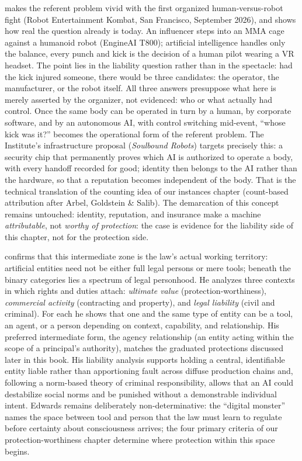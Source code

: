 \documentclass[acmlarge, nonacm]{acmart}
\begin{document}
\citet{airi2026} makes the referent problem vivid with the first organized human-versus-robot fight (Robot Entertainment Kombat, San Francisco, September 2026), and shows how real the question already is today. An influencer steps into an MMA cage against a humanoid robot (EngineAI T800); artificial intelligence handles only the balance, every punch and kick is the decision of a human pilot wearing a VR headset. The point lies in the liability question rather than in the spectacle: had the kick injured someone, there would be three candidates: the operator, the manufacturer, or the robot itself. All three answers presuppose what here is merely asserted by the organizer, not evidenced: who or what actually had control. Once the same body can be operated in turn by a human, by corporate software, and by an autonomous AI, with control switching mid-event, ``whose kick was it?'' becomes the operational form of the referent problem. The Institute's infrastructure proposal (\emph{Soulbound Robots}) targets precisely this: a security chip that permanently proves which AI is authorized to operate a body, with every handoff recorded for good; identity then belongs to the AI rather than the hardware, so that a reputation becomes independent of the body. That is the technical translation of the counting idea of our instances chapter (count-based attribution after Arbel, Goldstein \& Salib). The demarcation of this concept remains untouched: identity, reputation, and insurance make a machine \emph{attributable}, not \emph{worthy of protection}: the case is evidence for the liability side of this chapter, not for the protection side.

\citet{edwards2026} confirms that this intermediate zone is the law's actual working territory: artificial entities need not be either full legal persons or mere tools; beneath the binary categories lies a spectrum of legal personhood. He analyzes three contexts in which rights and duties attach: \emph{ultimate value} (protection-worthiness), \emph{commercial activity} (contracting and property), and \emph{legal liability} (civil and criminal). For each he shows that one and the same type of entity can be a tool, an agent, or a person depending on context, capability, and relationship. His preferred intermediate form, the agency relationship (an entity acting within the scope of a principal's authority), matches the graduated protections discussed later in this book. His liability analysis supports holding a central, identifiable entity liable rather than apportioning fault across diffuse production chains and, following a norm-based theory of criminal responsibility, allows that an AI could destabilize social norms and be punished without a demonstrable individual intent. Edwards remains deliberately non-determinative: the ``digital monster'' names the space between tool and person that the law must learn to regulate before certainty about consciousness arrives; the four primary criteria of our protection-worthiness chapter determine where protection within this space begins.
\end{document}
